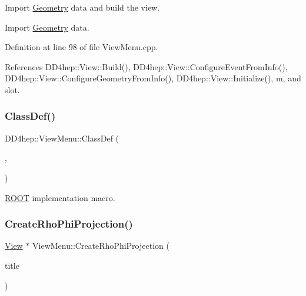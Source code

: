 Import \hyperlink{namespace_d_d4hep_1_1_geometry}{Geometry} data and build the view. 

Import \hyperlink{namespace_d_d4hep_1_1_geometry}{Geometry} data. 

Definition at line 98 of file View\+Menu.\+cpp.



References D\+D4hep\+::\+View\+::\+Build(), D\+D4hep\+::\+View\+::\+Configure\+Event\+From\+Info(), D\+D4hep\+::\+View\+::\+Configure\+Geometry\+From\+Info(), D\+D4hep\+::\+View\+::\+Initialize(), m, and slot.

\hypertarget{class_d_d4hep_1_1_view_menu_ae114589d23508b5e814581c6b198858b}{}\label{class_d_d4hep_1_1_view_menu_ae114589d23508b5e814581c6b198858b} 
\subsubsection{\texorpdfstring{Class\+Def()}{ClassDef()}}
{\footnotesize\ttfamily D\+D4hep\+::\+View\+Menu\+::\+Class\+Def (\begin{DoxyParamCaption}\item[{\hyperlink{class_d_d4hep_1_1_view_menu}{View\+Menu}}]{,  }\item[{0}]{ }\end{DoxyParamCaption})}



\hyperlink{namespace_r_o_o_t}{R\+O\+OT} implementation macro. 

\hypertarget{class_d_d4hep_1_1_view_menu_a66ee705a3132333b27a1eed2ea6caeea}{}\label{class_d_d4hep_1_1_view_menu_a66ee705a3132333b27a1eed2ea6caeea} 
\subsubsection{\texorpdfstring{Create\+Rho\+Phi\+Projection()}{CreateRhoPhiProjection()}}
{\footnotesize\ttfamily \hyperlink{class_d_d4hep_1_1_view}{View} $\ast$ View\+Menu\+::\+Create\+Rho\+Phi\+Projection (\begin{DoxyParamCaption}\item[{const std\+::string \&}]{title }\end{DoxyParamCaption})}



